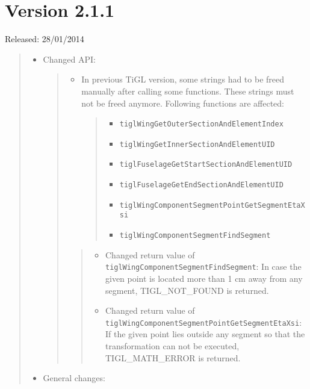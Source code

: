 \documentclass[]{scrartcl}
\begin{document}
\section{Version 2.1.1}\label{version-2.1.1}

Released: 28/01/2014

\begin{quote}
\begin{itemize}
\item
  Changed API:

  \begin{quote}
  \begin{itemize}
  \item
    In previous TiGL version, some strings had to be freed manually
    after calling some functions. These strings must not be freed
    anymore. Following functions are affected:

    \begin{quote}
    \begin{itemize}
    \itemsep1pt\parskip0pt
    \item
      \texttt{tiglWingGetOuterSectionAndElementIndex}
    \item
      \texttt{tiglWingGetInnerSectionAndElementUID}
    \item
      \texttt{tiglFuselageGetStartSectionAndElementUID}
    \item
      \texttt{tiglFuselageGetEndSectionAndElementUID}
    \item
      \texttt{tiglWingComponentSegmentPointGetSegmentEtaXsi}
    \item
      \texttt{tiglWingComponentSegmentFindSegment}
    \end{itemize}
    \end{quote}
  \end{itemize}

  \begin{quote}
  \begin{itemize}
  \itemsep1pt\parskip0pt
  \item
    Changed return value of
    \texttt{tiglWingComponentSegmentFindSegment}: In case the given
    point is located more than 1 cm away from any segment,
    TIGL\_NOT\_FOUND is returned.
  \item
    Changed return value of
    \texttt{tiglWingComponentSegmentPointGetSegmentEtaXsi}: If the given
    point lies outside any segment so that the transformation can not be
    executed, TIGL\_MATH\_ERROR is returned.
  \end{itemize}
  \end{quote}
  \end{quote}
\item
  General changes:


\end{itemize}
\end{quote}
\end{document}
